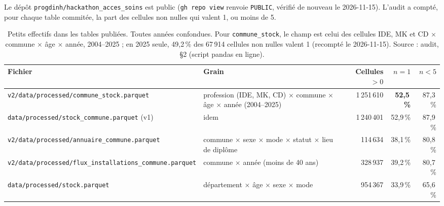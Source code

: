 Le dépôt \texttt{progdinh/\allowbreak{}hackathon\_\allowbreak{}acces\_\allowbreak{}soins} est public (\texttt{gh repo view} renvoie \texttt{PUBLIC}\mesure{}, vérifié de nouveau le 2026-11-15).
L'audit a compté, pour chaque table commitée, la part des cellules non nulles qui valent 1, ou moins de 5.

\begin{table}[htbp]\centering\small
\caption{Petits effectifs dans les tables publiées. Toutes années confondues. Pour \texttt{commune\_\allowbreak{}stock}, le champ est celui des cellules IDE, MK et CD $\times$ commune $\times$ âge $\times$ année, 2004--2025 ; en 2025 seule, 49,2\mesure{}\,\% des 67\,914\mesure{} cellules non nulles valent 1 (recompté le 2026-11-15). Source : audit, §2 (script pandas en ligne).}\label{conf:tab-petits}
\begin{tabular}{@{}p{}p{}rrr@{}}
\toprule Fichier & Grain & Cellules $>0$ & $n=1$ & $n<5$ \\ \midrule
\texttt{v2/\allowbreak{}data/\allowbreak{}processed/\allowbreak{}commune\_\allowbreak{}stock.parquet} & profession (IDE, MK, CD) $\times$ commune $\times$ âge $\times$ année (2004--2025) & 1\,251\,610\mesure{} & \textbf{52,5\mesure{}\,\%} & 87,3\mesure{}\,\% \\
\texttt{data/\allowbreak{}processed/\allowbreak{}stock\_\allowbreak{}commune.parquet} (v1) & idem & 1\,240\,401\mesure{} & 52,9\mesure{}\,\% & 87,9\mesure{}\,\% \\
\texttt{v2/\allowbreak{}data/\allowbreak{}processed/\allowbreak{}annuaire\_\allowbreak{}commune.parquet} & commune $\times$ sexe $\times$ mode $\times$ statut $\times$ lieu de diplôme & 114\,634\mesure{} & 38,1\mesure{}\,\% & 80,8\mesure{}\,\% \\
\texttt{v2/\allowbreak{}data/\allowbreak{}processed/\allowbreak{}flux\_\allowbreak{}installations\_\allowbreak{}commune.parquet} & commune $\times$ année (moins de 40 ans) & 328\,937\mesure{} & 39,2\mesure{}\,\% & 80,7\mesure{}\,\% \\
\texttt{data/\allowbreak{}processed/\allowbreak{}stock.parquet} & département $\times$ âge $\times$ sexe $\times$ mode & 954\,367\mesure{} & 33,9\mesure{}\,\% & 65,6\mesure{}\,\% \\ \bottomrule
\end{tabular}
\end{table}

